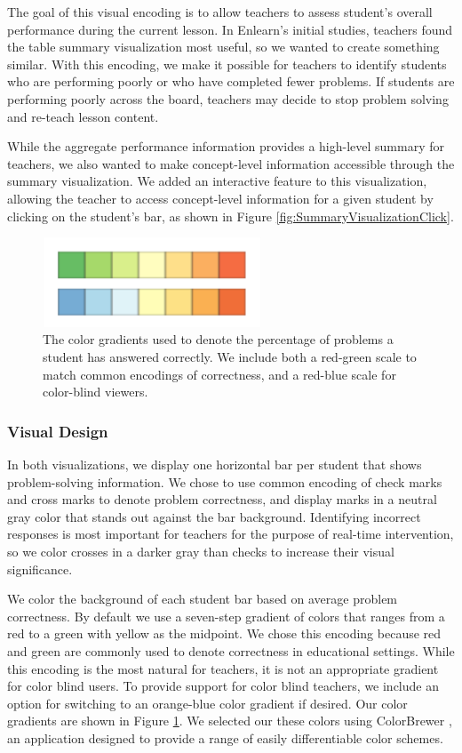 \documentclass{sigchi}
\begin{document}
The goal of this visual encoding is to allow teachers to assess student's overall performance during the current lesson. In Enlearn's initial studies, teachers found the table summary visualization most useful, so we wanted to create something similar. With this encoding, we make it possible for teachers to identify students who are performing poorly or who have completed fewer problems. If students are performing poorly across the board, teachers may decide to stop problem solving and re-teach lesson content. 

While the aggregate performance information provides a high-level summary for teachers, we also wanted to make concept-level information accessible through the summary visualization. We added an interactive feature to this visualization, allowing the teacher to access concept-level information for a given student by clicking on the student's bar, as shown in Figure \ref{fig:SummaryVisualizationClick}.

\begin{figure}[t]
\centering
\includegraphics[width=65mm]{images/ColorGradients.pdf}
\caption{The color gradients used to denote the percentage of problems a student has answered correctly. We include both a red-green scale to match common encodings of correctness, and a red-blue scale for color-blind viewers.}
\label{fig:ColorGradients}
\end{figure}

\subsubsection{Visual Design}
In both visualizations, we display one horizontal bar per student that shows problem-solving information. We chose to use common encoding of check marks and cross marks to denote problem correctness, and display marks in a neutral gray color that stands out against the bar background. Identifying incorrect responses is most important for teachers for the purpose of real-time intervention, so we color crosses in a darker gray than checks to increase their visual significance.

We color the background of each student bar based on average problem correctness. By default we use a seven-step gradient of colors that ranges from a red to a  green with yellow as the midpoint. We chose this encoding because red and green are commonly used to denote correctness in educational settings. While this encoding is the most natural for teachers, it is not an appropriate gradient for color blind users. To provide support for color blind teachers, we include an option for switching to an orange-blue color gradient if desired. Our color gradients are shown in Figure \ref{fig:ColorGradients}. We selected our these colors using ColorBrewer \cite{ColorBrewer}, an application designed to provide a range of easily differentiable color schemes.
\end{document}
